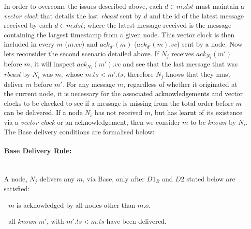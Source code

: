     In order to overcome the issues described above, each $d \in m.dst$ must maintain a \emph{vector clock}\citep{Mattern88virtualtime, fidge1988timestamps} that details the last \emph{rbcast} sent by $d$ and the id of the latest message received by each $d \in m.dst$; where the latest message received is the message containing the largest timestamp from a given node.  This vector clock is then included in every $m$ ($m.vc$) and $ack_{d'}(m)$ ($ack_{d'}(m).vc$) sent by a node.  Now lets reconsider the second scenario detailed above.  If $N_j$ receives $ack_{N_i}(m')$ before $m$, it will inspect $ack_{N_i}(m').vc$ and see that the last message that was \emph{rbcast} by $N_i$ was $m$, whose $m.ts < m'.ts$, therefore $N_j$ knows that they must deliver $m$ before $m'$.  For any message $m$, regardless of whether it originated at the current node, it is necessary for the associated acknowledgements and vector clocks to be checked to see if a message is missing from the total order before $m$ can be delivered.  If a node $N_i$ has not received $m$, but has learnt of its existence via a \emph{vector clock} or an acknowledgement, then we consider $m$ to be \emph{known} by $N_i$.  The \textsf{Base} delivery conditions are formalised below:
    
    \paragraph{\textsf{Base} Delivery Rule:}\hspace{0pt} \\
        A node, $N_j$ delivers any $m$, via \textsf{Base}, only after $D1_B$ and $D2$ stated below are satisfied:
        \begin{description}[labelindent=1cm]
            \item[$\boldsymbol{D1_B}$] - $m$ is acknowledged by all nodes other than $m.o$. 
            \item[$\boldsymbol{D2}$] - all \emph{known} $m'$, with $m'.ts < m.ts$ have been delivered.
        \end{description}
    
